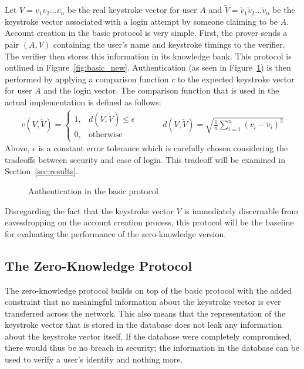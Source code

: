 \documentclass[11pt]{article}
\begin{document}
Let $V=v_1v_2\ldots v_n$ be the real keystroke vector for user $A$ and $\tilde V = \tilde v_1\tilde v_2\ldots\tilde v_n$ be the keystroke vector associated with a login attempt by someone claiming to be $A$. Account creation in the basic protocol is very simple. First, the prover sends a pair $(A,V)$ containing the user's name and keystroke timings to the verifier. The verifier then stores this information in its knowledge bank. This protocol is outlined in Figure~\ref{fig:basic_new}. Authentication (as seen in Figure~\ref{fig:basic_auth}) is then performed by applying a comparison function $c$ to the expected keystroke vector for user $A$ and the login vector. The comparison function that is used in the actual implementation is defined as follows:
$$\begin{array}{ccc}
c(V,\tilde V) = \begin{cases}
  1, & d(V, \tilde V) \le \epsilon \\
  0, & \text{otherwise}
\end{cases}
& \;\;\;\;\; &
d(V,\tilde V) = \sqrt{\frac1n\sum_{i=1}^n(v_i - \tilde v_i)^2}
\end{array}$$
Above, $\epsilon$ is a constant error tolerance which is carefully chosen considering the tradeoffs between security and ease of login. This tradeoff will be examined in Section~\ref{sec:results}.

\begin{figure}[h!]
\centering
{}
\caption{Authentication in the basic protocol}
\label{fig:basic_auth}
\end{figure}


Disregarding the fact that the keystroke vector $V$ is immediately discernable from eavesdropping on the account creation process, this protocol will be the baseline for evaluating the performance of the zero-knowledge version.

\subsection{The Zero-Knowledge Protocol}
\label{sec:zkp-prot}
The zero-knowledge protocol builds on top of the basic protocol with the added constraint that no meaningful information about the keystroke vector is ever transferred across the network. This also means that the representation of the keystroke vector that is stored in the database does not leak any information about the keystroke vector itself. If the database were completely compromised, there would thus be no breach in security; the information in the database can be used to verify a user's identity and nothing more.
\end{document}
